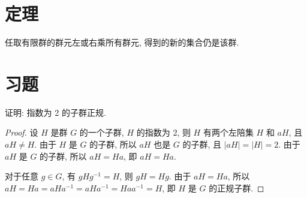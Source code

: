 
    \section{定理}
        \begin{theorem}
            任取有限群的群元左或右乘所有群元, 得到的新的集合仍是该群.
            $$
            
            $$
        \end{theorem}

    \section{习题}  

        \begin{example}
            证明: 指数为 2 的子群正规.
        \end{example}

        \begin{proof}
            设 $H$ 是群 $G$ 的一个子群, $H$ 的指数为 2, 则 $H$ 有两个左陪集 $H$ 和 $aH$, 且 $aH \neq H$. 由于 $H$ 是 $G$ 的子群, 所以 $aH$ 也是 $G$ 的子群, 且 $|aH| = |H| = 2$. 由于 $aH$ 是 $G$ 的子群, 所以 $aH = Ha$, 即 $aH = Ha$.

            对于任意 $g \in G$, 有 $gHg^{-1} = H$, 则 $gH = Hg$. 由于 $aH = Ha$, 所以 $aH = Ha = aHa^{-1} = aHa^{-1} = Haa^{-1} = H$, 即 $H$ 是 $G$ 的正规子群.
        \end{proof}
